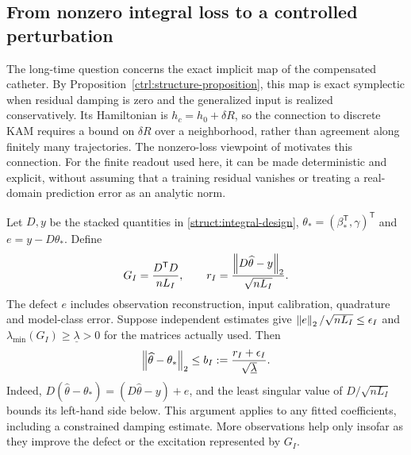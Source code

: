 \subsection{From nonzero integral loss to a controlled perturbation}
\label{kam:learning-section}

The long-time question concerns the exact implicit map of the compensated catheter. By Proposition~\ref{ctrl:structure-proposition}, this map is exact symplectic when residual damping is zero and the generalized input is realized conservatively. Its Hamiltonian is $h_c=h_0+\delta R$, so the connection to discrete KAM requires a bound on $\delta R$ over a neighborhood, rather than agreement along finitely many trajectories. The nonzero-loss viewpoint of \citet{chen2022} motivates this connection. For the finite readout used here, it can be made deterministic and explicit, without assuming that a training residual vanishes or treating a real-domain prediction error as an analytic norm.

Let $D,y$ be the stacked quantities in \eqref{struct:integral-design}, $\theta_*=(\beta_*^{\mathsf T},\gamma)^{\mathsf T}$ and $e=y-D\theta_*$. Define
\begin{equation}\label{kam:gram}
 G_I=\frac{D^{\mathsf T}D}{nL_I},\qquad
 r_I=\frac{\left\lVert D\widehat\theta-y\right\rVert_2}{\sqrt{nL_I}}.
\end{equation}
The defect $e$ includes observation reconstruction, input calibration, quadrature and model-class error. Suppose independent estimates give
$\left\lVert e\right\rVert_2/\sqrt{nL_I}\le\epsilon_I$ and
$\lambda_{\min}(G_I)\ge\underline\lambda>0$ for the matrices actually used. Then
\begin{equation}\label{kam:integral-bound}
 \left\lVert\widehat\theta-\theta_*\right\rVert_2
 \le b_I:=\frac{r_I+\epsilon_I}{\sqrt{\underline\lambda}}.
\end{equation}
Indeed, $D(\widehat\theta-\theta_*)=(D\widehat\theta-y)+e$, and the least singular value of $D/\sqrt{nL_I}$ bounds its left-hand side below. This argument applies to any fitted coefficients, including a constrained damping estimate. More observations help only insofar as they improve the defect or the excitation represented by $G_I$.

